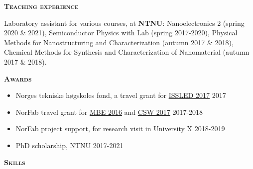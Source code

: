 \newpage

\begin{adjustwidth}{0cm}{1cm} %
{\vspace{3mm} \color{sophia} \small \bfseries {} \selectfont \scshape Teaching experience} \vspace{3mm}
\end{adjustwidth}

\noindent Laboratory assistant for various courses, at \textbf{NTNU}: Nanoelectronics 2 (spring 2020 \& 2021), Semiconductor Physics with Lab (spring 2017-2020), Physical Methods for Nanostructuring and Characterization (autumn 2017 \& 2018), Chemical Methods for Synthesis and Characterization of Nanomaterial (autumn 2017 \& 2018).


\begin{adjustwidth}{0cm}{1cm} %
{\vspace{3mm} \color{sophia} \small \bfseries {} \selectfont \scshape Awards} \vspace{1mm}
\end{adjustwidth}

\begin{itemize}[itemsep=0.7pt, parsep=0.7pt, leftmargin=7mm, label=] %
    \item Norges tekniske h{\o}gskoles fond, a travel grant for \href{http://ece.umich.edu/issled2017/}{ISSLED 2017} \hfill 2017
    \item NorFab travel grant for \href{https://mbe2016.sciencesconf.org/conference/mbe2016/pages/MBE2016_Final_program.pdf#page=42}{MBE 2016} and \href{http://www.csw2017.org}{CSW 2017} \hfill 2017-2018
    \item NorFab project support, for research visit in University X \hfill 2018-2019
    \item PhD scholarship, NTNU \hfill 2017-2021
\end{itemize}


\begin{adjustwidth}{0cm}{1cm} %
{\vspace{2mm} \color{sophia} \small \bfseries {} \selectfont \scshape Skills} \vspace{3mm}
\end{adjustwidth}

